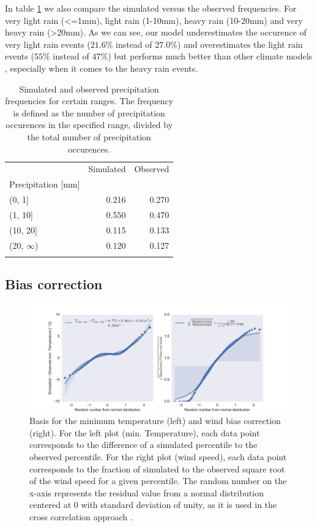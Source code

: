 \begin{refsection}
In table \ref{tab:freq} we also compare the simulated versus the observed frequencies. For very light rain (<=1mm), light rain (1-10mm), heavy rain (10-20mm) and very heavy rain (>20mm). As we can see, our model underestimates the occurence of very light rain events ($21.6\%$ instead of $27.0\%$) and overestimates the light rain events ($55\%$ instead of $47\%$) but performs much better than other climate models \citep{Dai2006,SunSolomonDaiEtAl2006}, especially when it comes to the heavy rain events.

\begin{table}
	\caption[Simulated and observed precipitation frequencies.]{Simulated and observed precipitation frequencies for certain ranges. The frequency is defined as the number of precipitation occurences in the specified range, divided by the total number of precipitation occurences.}
	\label{tab:freq}
	\begin{tabular}{lrr}
		\tophline
		{} &  Simulated &  Observed \\
		Precipitation [mm]      &            &           \\
		\middlehline
		(0, 1]    &      0.216 &     0.270 \\
		(1, 10]   &      0.550 &     0.470 \\
		(10, 20]  &      0.115 &     0.133 \\
		(20, $\infty$) &      0.120 &     0.127 \\
		\bottomhline
	\end{tabular}
\end{table}


\subsection{Bias correction} \label{sec:bias}
\begin{figure}
	\includegraphics[width=12cm]{figures/wind_tmin_bias_correction.pdf}
	\caption[min. temperature and wind bias correction]{Basis for the minimum temperature (left) and wind bias correction (right). For the left plot (min. Temperature), each data point corresponds to the difference of a simulated percentile to the observed percentile. For the right plot (wind speed), each data point corresponds to the fraction of simulated to the observed square root of the wind speed for a given percentile. The random number on the x-axis represents the residual value from a normal distribution centered at 0 with standard deviation of unity, as it is used in the cross correlation approach \citep{Richardson1981}.}
	\label{fig:bias}
\end{figure}


\end{refsection}
